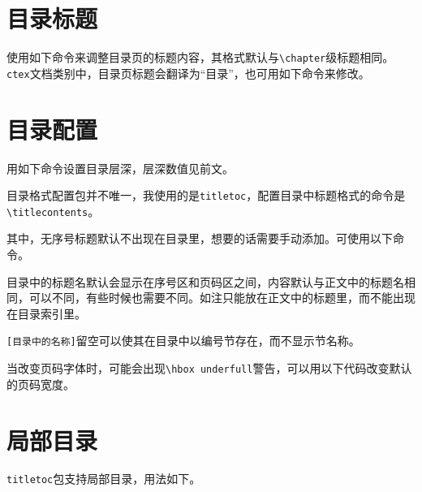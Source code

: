 \documentclass[10pt,openany]{book}
\begin{document}
\begin{sloppypar}
    \section{目录标题}

    使用如下命令来调整目录页的标题内容，其格式默认与\texttt{\textbackslash{}chapter}级标题相同。\texttt{ctex}文档类别中，目录页标题会翻译为“目录”，也可用如下命令来修改。

    

    \section{目录配置}

    用如下命令设置目录层深，层深数值见前文。

    

    目录格式配置包并不唯一，我使用的是\texttt{titletoc}，配置目录中标题格式的命令是\texttt{\textbackslash{}titlecontents}。

    

    其中，无序号标题默认不出现在目录里，想要的话需要手动添加。可使用以下命令。

    

    目录中的标题名默认会显示在序号区和页码区之间，内容默认与正文中的标题名相同，可以不同，有些时候也需要不同。如注只能放在正文中的标题里，而不能出现在目录索引里。

    

    \texttt{{[}目录中的名称{]}}留空可以使其在目录中以编号节存在，而不显示节名称。

    当改变页码字体时，可能会出现\texttt{\textbackslash{}hbox\ underfull}警告，可以用以下代码改变默认的页码宽度。

    

    \section{局部目录}

    \texttt{titletoc}包支持局部目录，用法如下。

    


\end{sloppypar}
\end{document}
